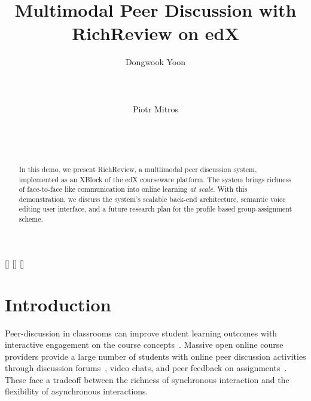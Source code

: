 \documentclass{sigchi}
\begin{document}
\title{Multimodal Peer Discussion with RichReview on edX}

\author{
  \alignauthor Dongwook Yoon\\
    \\
    \\
    \\
  \alignauthor Piotr Mitros\\
    \\
    \\
    \\
}

\maketitle

\begin{abstract}
In this demo, we present RichReview, a multlimodal peer discussion system, implemented as an XBlock of the edX courseware platform. The system brings richness of face-to-face like communication into online learning \emph{at scale}. With this demonstration, we discuss the system's scalable back-end architecture, semantic voice editing user interface, and a future research plan for the profile based group-assignment scheme.
\end{abstract}


[] 
[] 
[] 

\section{Introduction}

Peer-discussion in classrooms can improve student learning outcomes with interactive engagement on the course concepts~\cite{chi2014icap}.
Massive open online course providers provide a large number of students with online peer discussion activities through discussion forums~\cite{13Mitros6002}, video chats, and peer feedback on assignments~\cite{linc}. These face a tradeoff between the richness of synchronous interaction and the flexibility of asynchronous interactions.
\end{document}
